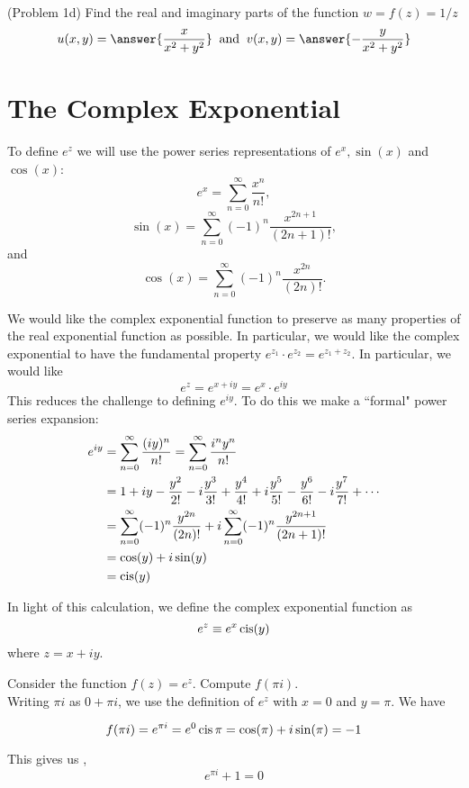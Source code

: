 \documentclass[handout]{ximera}
\begin{document}
\begin{problem}(Problem 1d)
Find the real and imaginary parts of the function $w = f(z) = 1/z$   
\[
u(x,y) = \answer{\frac{x}{x^2 + y^2}} \;\; \mbox{and} \;\; v(x,y) = \answer{-\frac{y}{x^2 + y^2}}
\]

\end{problem}

\section{The Complex Exponential}

To define $e^z$ we will use the power series representations of $e^x, \sin(x)$ and $\cos(x)$:
\[
e^x = \sum_{n=0}^\infty \frac{x^n}{n!},
\]
\[
\sin(x) = \sum_{n=0}^\infty (-1)^n \frac{x^{2n+1}}{(2n+1)!},
\]
and
\[
\cos(x) = \sum_{n=0}^\infty (-1)^n \frac{x^{2n}}{(2n)!}.
\]

We would like the complex exponential function to preserve as many properties of the real exponential function as possible. 
In particular, we would like the complex exponential to have the fundamental property $e^{z_1}\cdot e^{z_2} = e^{z_1 + z_2}$.
In particular, we would like
\[
e^z = e^{x+iy} = e^x \cdot e^{iy}
\]
This reduces the challenge to defining $e^{iy}$. To do this we make a ``formal" power series expansion:
\begin{align*}
e^{iy} &= \sum_{n=0}^\infty \frac{(iy)^n}{n!} = \sum_{n=0}^\infty \frac{i^ny^n}{n!}\\
       &= 1+iy -\frac{y^2}{2!} -i\frac{y^3}{3!} + \frac{y^4}{4!} + i\frac{y^5}{5!} - \frac{y^6}{6!} -i \frac{y^7}{7!} + \cdots\\
       &= \sum_{n=0}^\infty (-1)^n\frac{y^{2n}}{(2n)!} + i\sum_{n=0}^\infty (-1)^n\frac{y^{2n+1}}{(2n+1)!}\\
       &= \cos(y) + i\sin(y)\\
       &= \operatorname{cis}(y)
\end{align*}


In light of this calculation, we define the complex exponential function as
\[
e^z \equiv e^x \operatorname{cis}(y) 
\]
where $z = x+iy$.

\begin{example}
Consider the function $f(z) = e^z$. Compute $f(\pi i)$.\\
Writing $\pi i$ as $0+\pi i$, we use the definition of $e^z$ with $x = 0 $ and $y= \pi$.
We have 

\[ f(\pi i) = e^{\pi i} = e^0 \operatorname{cis} \pi = \cos(\pi) + i\sin(\pi) = -1 \]

This gives us ,
\[
e^{\pi i} +1 = 0
\]

\end{example}
\end{document}
